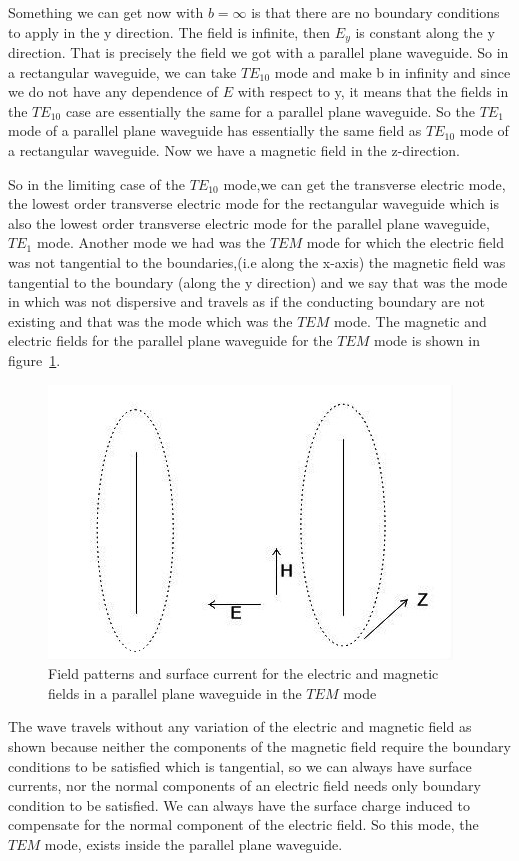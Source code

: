 Something we can get now with ${b=\infty}$ is that there are no boundary conditions to apply in the y direction. The field is infinite, then ${E_y}$ is constant along the y direction. That is precisely the field we got with a parallel plane waveguide. So in a rectangular waveguide, we can take ${TE_{10}}$ mode and make b in infinity and since we do not have any dependence of $E$ with respect to y, it means that the fields in the ${TE_{10}}$ case are essentially the same for a parallel plane waveguide. So the ${TE_1}$ mode of a parallel plane waveguide has essentially the same field as ${TE_{10}}$ mode of a rectangular waveguide. Now we have a magnetic field in the z-direction. 

So in the limiting case of the ${TE_{10}}$ mode,we can get the transverse electric mode, the lowest order transverse electric mode for the rectangular waveguide which is also the lowest order transverse electric mode for the parallel plane waveguide, $TE_1$ mode. Another mode we had was the $TEM$ mode for which the electric field was not tangential to the boundaries,(i.e along the x-axis) the magnetic field was tangential to the boundary (along the y direction) and we say that was the mode in which was not dispersive and travels as if the conducting boundary are not existing and that was the mode which was the $TEM$ mode. The magnetic and electric fields for the parallel plane waveguide for the $TEM$ mode is shown in figure~\ref{fig:page4}. 
\begin{figure}[h]
\centering
\includegraphics[width=.7\linewidth]{./graphics/page4}
\caption{Field patterns and surface current for the electric and magnetic fields in a parallel plane waveguide in the $TEM$ mode}
\label{fig:page4}
\end{figure}

The wave travels without any variation of the electric and magnetic field as shown because neither the components of the magnetic field require the boundary conditions to be satisfied which is tangential, so we can always have surface currents, nor the normal components of an electric field needs only boundary condition to be satisfied. We can always have the surface charge induced to compensate for the normal component of the electric field. So this mode, the $TEM$ mode, exists inside the parallel plane waveguide.

